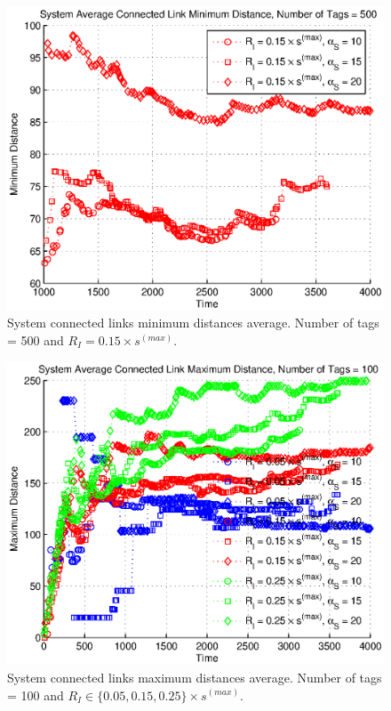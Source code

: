 \begin{figure}
\centering
\includegraphics[width=5in]{Chapter_4_Figures/sys_links_min_dist_500tags_15diam.eps}
\caption{System connected links minimum distances average. Number of tags = 500 and $R_I = 0.15 \times s^{(max)}$.}
\label{Figure: sys_links_min_dist_500tags_15diam.eps}
\end{figure}
\begin{figure}
\centering
\includegraphics[width=5in]{Chapter_4_Figures/sys_links_max_dist_100tags_all.eps}
\caption{System connected links maximum distances average. Number of tags = 100 and $R_I \in \{0.05, 0.15, 0.25\} \times s^{(max)}$.}
\label{Figure: sys_links_max_dist_100tags_all.eps}
\end{figure}
\clearpage

